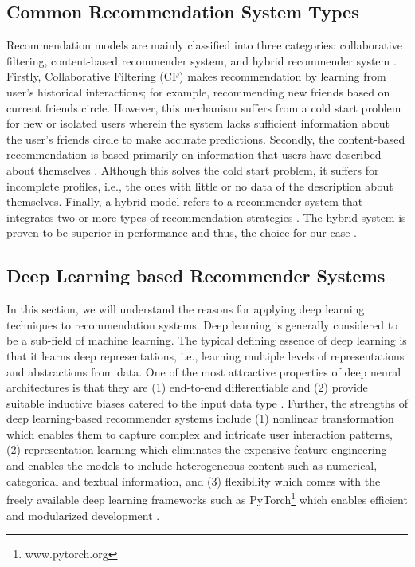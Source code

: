 \documentclass{kththesis}
\begin{document}
\subsection{Common Recommendation System Types}
Recommendation models are mainly classified into three categories: collaborative filtering, content-based recommender system, and hybrid recommender system \cite{shuai}. Firstly, Collaborative Filtering (CF) makes recommendation by learning from user's historical interactions; for example, recommending new friends based on current friends circle. However, this mechanism suffers from a cold start problem for new or isolated users wherein the system lacks sufficient information about the user's friends circle to make accurate predictions. Secondly, the content-based recommendation is based primarily on information that users have described about themselves \cite{shuai}. Although this solves the cold start problem, it suffers for incomplete profiles, i.e., the ones with little or no data of the description about themselves. Finally, a hybrid model refers to a recommender system that integrates two or more types of recommendation strategies \cite{shuai}. The hybrid system is proven to be superior in performance and thus, the choice for our case \cite{shuai}.

\subsection{Deep Learning based Recommender Systems}
In this section, we will understand the reasons for applying deep learning techniques to recommendation systems. Deep learning is generally considered to be a sub-field of machine learning. The typical defining essence of deep learning is that it learns deep representations, i.e., learning multiple levels of representations and abstractions from data. One of the most attractive properties of deep neural architectures is that they are (1) end-to-end differentiable and (2) provide suitable inductive biases catered to the input data type \cite{shuai}. Further, the strengths of deep learning-based recommender systems include (1) nonlinear transformation which enables them to capture complex and intricate user interaction patterns, (2) representation learning which eliminates the expensive feature engineering and enables the models to include heterogeneous content such as numerical, categorical and textual information, and (3) flexibility which comes with the freely available deep learning frameworks such as PyTorch\footnote{www.pytorch.org} which enables efficient and modularized development \cite{shuai}. \\
\end{document}
